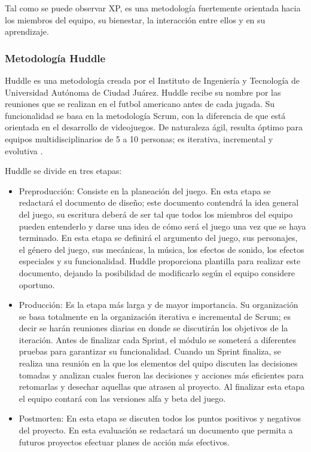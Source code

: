 Tal como se puede observar XP, es una metodología fuertemente orientada hacia los miembros del equipo, su bienestar, la interacción entre ellos y en su aprendizaje.

\subsubsection{Metodología Huddle}
Huddle es una metodología creada por el Instituto de Ingeniería y Tecnología de Universidad Autónoma de Ciudad Juárez. Huddle recibe su nombre por las reuniones que se realizan en el futbol americano antes de cada jugada. Su funcionalidad se basa en la metodología Scrum, con la diferencia de que está orientada en el desarrollo de videojuegos.  De naturaleza ágil, resulta óptimo para equipos multidisciplinarios de 5 a 10 personas; es iterativa, incremental y evolutiva \cite{Ref_Huddle}.
\\
\par
Huddle se divide en tres etapas: 
	\begin{itemize}
		\item Preproducción: Consiste en la planeación del juego. En esta etapa se redactará el documento de diseño; este documento contendrá la idea general del juego, su escritura deberá de ser tal que todos los miembros del equipo pueden entenderlo y darse una idea de cómo será el juego una vez que se haya terminado. En esta etapa se definirá el argumento del juego, sus personajes, el género del juego, sus mecánicas, la música, los efectos de sonido, los efectos especiales y su funcionalidad. Huddle proporciona plantilla para realizar este documento, dejando la posibilidad de modificarlo según el equipo considere oportuno.
		\item Producción: Es la etapa más larga y de mayor importancia. Su organización se basa totalmente en la organización iterativa e incremental de Scrum; es decir se harán reuniones diarias en donde se discutirán los objetivos de la iteración. Antes de finalizar cada Sprint, el módulo se someterá a diferentes pruebas para garantizar su funcionalidad. Cuando un Sprint finaliza, se realiza una reunión en la que los elementos del quipo discuten las decisiones tomadas y analizan cuales fueron las decisiones y acciones más eficientes para retomarlas y desechar aquellas que atrasen al proyecto. Al finalizar esta etapa el equipo contará con las versiones alfa y beta del juego. 
		\item Postmorten: En esta etapa se discuten todos los puntos positivos y negativos del proyecto. En esta evaluación se redactará un documento que permita a futuros proyectos efectuar planes de acción más efectivos\cite{Ref_Huddle}.
	\end{itemize}
